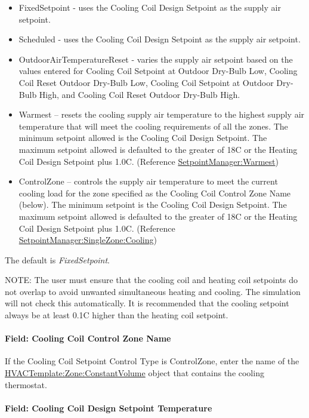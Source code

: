 \begin{itemize}
\item
  FixedSetpoint - uses the Cooling Coil Design Setpoint as the supply air setpoint.
\item
  Scheduled - uses the Cooling Coil Design Setpoint as the supply air setpoint.
\item
  OutdoorAirTemperatureReset - varies the supply air setpoint based on the values entered for Cooling Coil Setpoint at Outdoor Dry-Bulb Low, Cooling Coil Reset Outdoor Dry-Bulb Low, Cooling Coil Setpoint at Outdoor Dry-Bulb High, and Cooling Coil Reset Outdoor Dry-Bulb High.
\item
  Warmest -- resets the cooling supply air temperature to the highest supply air temperature that will meet the cooling requirements of all the zones. The minimum setpoint allowed is the Cooling Coil Design Setpoint. The maximum setpoint allowed is defaulted to the greater of 18C or the Heating Coil Design Setpoint plus 1.0C. (Reference \hyperref[setpointmanagerwarmest]{SetpointManager:Warmest})
\item
  ControlZone -- controls the supply air temperature to meet the current cooling load for the zone specified as the Cooling Coil Control Zone Name (below). The minimum setpoint is the Cooling Coil Design Setpoint. The maximum setpoint allowed is defaulted to the greater of 18C or the Heating Coil Design Setpoint plus 1.0C. (Reference \hyperref[setpointmanagersinglezonecooling]{SetpointManager:SingleZone:Cooling})
\end{itemize}

The default is \emph{FixedSetpoint}.

NOTE: The user must ensure that the cooling coil and heating coil setpoints do not overlap to avoid unwanted simultaneous heating and cooling. The simulation will not check this automatically. It is recommended that the cooling setpoint always be at least 0.1C higher than the heating coil setpoint.

\paragraph{Field: Cooling Coil Control Zone Name}\label{field-cooling-coil-control-zone-name}

If the Cooling Coil Setpoint Control Type is ControlZone, enter the name of the \hyperref[hvactemplatezoneconstantvolume]{HVACTemplate:Zone:ConstantVolume} object that contains the cooling thermostat.

\paragraph{Field: Cooling Coil Design Setpoint Temperature}\label{field-cooling-coil-design-setpoint-temperature}

